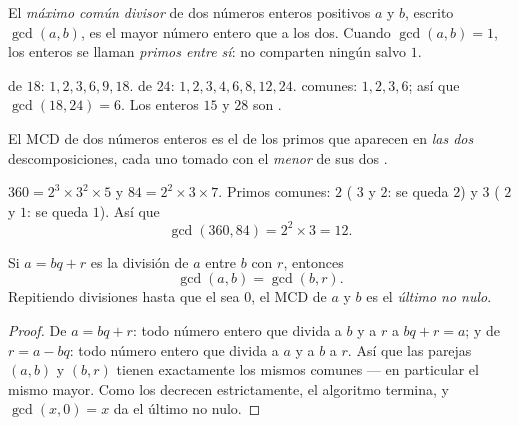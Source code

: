 \begin{definition}[MCD]\label{def:g9:arith:gcd}
El \emph{máximo común divisor} de dos
números enteros positivos $a$ y $b$, escrito $\gcd(a, b)$, es el mayor
número entero que  a los dos. Cuando $\gcd(a, b) = 1$, los enteros se llaman
\emph{primos entre sí}: no comparten ningún  salvo $1$.
\end{definition}

\begin{example}
 de $18$: $1, 2, 3, 6, 9, 18$.  de $24$: $1, 2, 3, 4, 6,
8, 12, 24$.  comunes: $1, 2, 3, 6$; así que $\gcd(18, 24) = 6$. Los
enteros $15$ y $28$ son .
\end{example}

\begin{proposition}\label{prop:g9:arith:gcdfact}
El MCD de dos números enteros es el  de los primos que aparecen en
\emph{las dos} descomposiciones, cada uno tomado con el \emph{menor} de sus dos
.
\end{proposition}
\admitted

\begin{example}\label{ex:g9:arith:gcdfact}
$360 = 2^3 \times 3^2 \times 5$ y $84 = 2^2 \times 3 \times 7$. Primos
comunes: $2$ ( $3$ y $2$: se queda $2$) y $3$ ( $2$ y
$1$: se queda $1$). Así que
\[
\gcd(360, 84) = 2^2 \times 3 = 12 .
\]
\end{example}

\begin{theorem}\label{thm:g9:arith:euclidalgo}
Si $a = bq + r$ es la división de $a$ entre $b$ con  $r$, entonces
\[
\gcd(a, b) = \gcd(b, r).
\]
Repitiendo divisiones hasta que el  sea $0$, el MCD de $a$ y $b$ es
el \emph{último  no nulo}.
\end{theorem}

\begin{proof}
De $a = bq + r$: todo número entero que divida a $b$ y a $r$  a $bq + r = a$;
y de $r = a - bq$: todo número entero que divida a $a$ y a $b$  a $r$. Así que
las parejas $(a, b)$ y $(b, r)$ tienen exactamente los mismos  comunes ---
en particular el mismo mayor. Como los  decrecen estrictamente,
el algoritmo termina, y $\gcd(x, 0) = x$ da el último  no
nulo.
\end{proof}

